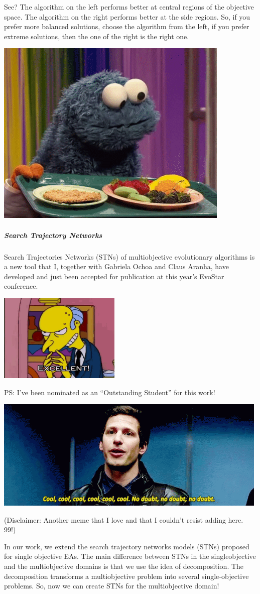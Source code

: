 \documentclass[
]{article}
\begin{document}
See? The algorithm on the left performs better at central regions of the
objective space. The algorithm on the right performs better at the side
regions. So, if you prefer more balanced solutions, choose the algorithm
from the left, if you prefer extreme solutions, then the one of the
right is the right one.

\includegraphics[width=0.4\linewidth]{gifs/choices}

\hypertarget{search-trajectory-networks}{%
\subparagraph{Search Trajectory
Networks}\label{search-trajectory-networks}}

Search Trajectories Networks (STNs) of multiobjective evolutionary
algorithms is a new tool that I, together with Gabriela Ochoa and Claus
Aranha, have developed and just been accepted for publication at this
year's EvoStar conference.

\includegraphics[width=0.4\linewidth]{gifs/thats_good}

PS: I've been nominated as an ``Outstanding Student'' for this work!

\includegraphics[width=0.4\linewidth]{gifs/cool_peralta}

(Disclaimer: Another meme that I love and that I couldn't resist adding
here. 99!)

In our work, we extend the search trajectory networks models (STNs)
proposed for single objective EAs. The main difference between STNs in
the singleobjective and the multiobjective domains is that we use the
idea of decomposition. The decomposition transforms a multiobjective
problem into several single-objective problems. So, now we can create
STNs for the multiobjective domain!
\end{document}
